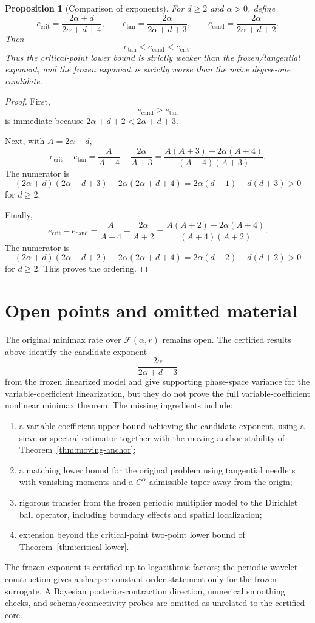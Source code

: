 \documentclass[12pt]{article}
\newtheorem{proposition}[theorem]{Proposition}
\theoremstyle{remark}
\begin{document}
\begin{proposition}[Comparison of exponents]
\label{prop:exponent-comparison}
For \(d\ge2\) and \(\alpha>0\), define
\[
e_{\mathrm{crit}}=\frac{2\alpha+d}{2\alpha+d+4},
\qquad
e_{\mathrm{tan}}=\frac{2\alpha}{2\alpha+d+3},
\qquad
e_{\mathrm{cand}}=\frac{2\alpha}{2\alpha+d+2}.
\]
Then
\[
e_{\mathrm{tan}}<e_{\mathrm{cand}}<e_{\mathrm{crit}}.
\]
Thus the critical-point lower bound is strictly weaker than the frozen/tangential exponent, and the frozen exponent is strictly worse than the naive degree-one candidate.
\end{proposition}
\begin{proof}
First,
\[
e_{\mathrm{cand}}>e_{\mathrm{tan}}
\]
is immediate because \(2\alpha+d+2<2\alpha+d+3\).

Next, with \(A=2\alpha+d\),
\[
e_{\mathrm{crit}}-e_{\mathrm{tan}}
=
\frac{A}{A+4}-\frac{2\alpha}{A+3}
=
\frac{A(A+3)-2\alpha(A+4)}{(A+4)(A+3)}.
\]
The numerator is
\[
(2\alpha+d)(2\alpha+d+3)-2\alpha(2\alpha+d+4)
=
2\alpha(d-1)+d(d+3)>0
\]
for \(d\ge2\).

Finally,
\[
e_{\mathrm{crit}}-e_{\mathrm{cand}}
=
\frac{A}{A+4}-\frac{2\alpha}{A+2}
=
\frac{A(A+2)-2\alpha(A+4)}{(A+4)(A+2)}.
\]
The numerator is
\[
(2\alpha+d)(2\alpha+d+2)-2\alpha(2\alpha+d+4)
=
2\alpha(d-2)+d(d+2)>0
\]
for \(d\ge2\). This proves the ordering.
\end{proof}

\section{Open points and omitted material}
\label{sec:open}

The original minimax rate over \(\mathcal F(\alpha,r)\) remains open. The certified results above identify the candidate exponent
\[
\frac{2\alpha}{2\alpha+d+3}
\]
from the frozen linearized model and give supporting phase-space variance for the variable-coefficient linearization, but they do not prove the full variable-coefficient nonlinear minimax theorem. The missing ingredients include:
\begin{enumerate}[label=(\arabic*)]
\item a variable-coefficient upper bound achieving the candidate exponent, using a sieve or spectral estimator together with the moving-anchor stability of Theorem~\ref{thm:moving-anchor};
\item a matching lower bound for the original problem using tangential needlets with vanishing moments and a \(C^\alpha\)-admissible taper away from the origin;
\item rigorous transfer from the frozen periodic multiplier model to the Dirichlet ball operator, including boundary effects and spatial localization;
\item extension beyond the critical-point two-point lower bound of Theorem~\ref{thm:critical-lower}.
\end{enumerate}
The frozen exponent is certified up to logarithmic factors; the periodic wavelet construction gives a sharper constant-order statement only for the frozen surrogate. A Bayesian posterior-contraction direction, numerical smoothing checks, and schema/connectivity probes are omitted as unrelated to the certified core.
\end{document}
